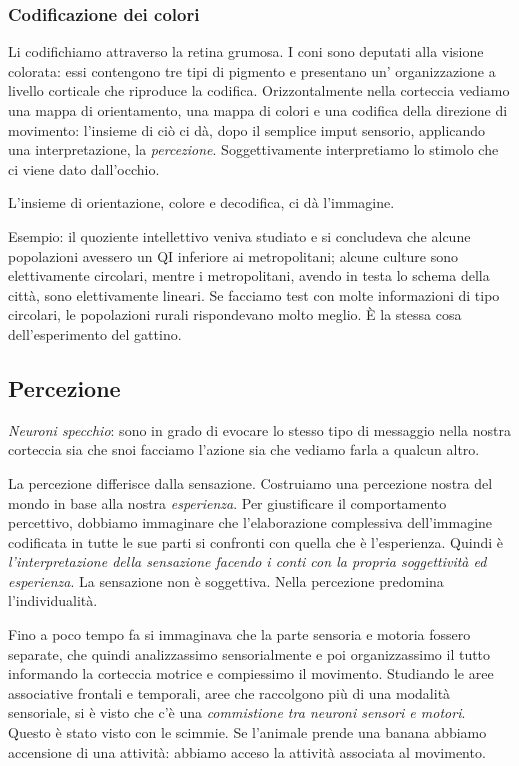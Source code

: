 \documentclass[a4paper,12pt]{article}
\begin{document}
\subsubsection{Codificazione dei colori}
Li codifichiamo attraverso la retina grumosa. I coni sono deputati alla visione colorata: essi contengono tre tipi di pigmento e presentano un' organizzazione a livello corticale che riproduce la codifica. Orizzontalmente nella corteccia vediamo una mappa di orientamento, una mappa di colori e una codifica della direzione di movimento: l'insieme di ciò ci dà, dopo il semplice imput sensorio, applicando una interpretazione, la \emph{percezione}. Soggettivamente interpretiamo lo stimolo che ci viene dato dall'occhio. 

L'insieme di orientazione, colore e decodifica, ci dà l'immagine.

Esempio: il quoziente intellettivo veniva studiato e si concludeva che alcune popolazioni avessero un QI inferiore ai metropolitani; alcune culture sono elettivamente circolari, mentre i metropolitani, avendo in testa lo schema della città, sono elettivamente lineari. Se facciamo test con molte informazioni di tipo circolari, le popolazioni rurali rispondevano molto meglio. È la stessa cosa dell'esperimento del gattino. 

\subsection{Percezione}
\emph{Neuroni specchio}: sono in grado di evocare lo stesso tipo di messaggio nella nostra corteccia sia che snoi facciamo l'azione sia che vediamo farla a qualcun altro.

La percezione differisce dalla sensazione. Costruiamo una percezione nostra del mondo in base alla nostra \emph{esperienza}. Per giustificare il comportamento percettivo, dobbiamo immaginare che l'elaborazione complessiva dell'immagine codificata in tutte le sue parti si confronti con quella che è l'esperienza. Quindi è \emph{l'interpretazione della sensazione facendo i conti con la propria soggettività ed esperienza}. La sensazione non è soggettiva. Nella percezione predomina l'individualità. 

Fino a poco tempo fa si immaginava che la parte sensoria e motoria fossero separate, che quindi analizzassimo sensorialmente e poi organizzassimo il tutto informando la corteccia motrice e compiessimo il movimento. Studiando le aree associative frontali e temporali, aree che raccolgono più di una modalità sensoriale, si è visto che c'è una \emph{commistione tra neuroni sensori e motori}. Questo è stato visto con le scimmie. Se l'animale prende una banana abbiamo accensione di una attività: abbiamo acceso la attività associata al movimento.
\end{document}
